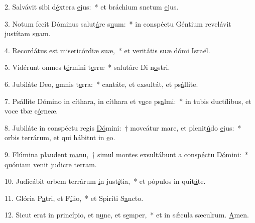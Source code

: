 2. Salvávit sibi d\uline{é}xtera \uline{e}jus:~* et bráchium snctum \uline{e}jus.\par 
3. Notum fecit Dóminus salut\uline{á}re s\uline{u}um:~* in conspéctu Géntium revelávit justítam s\uline{u}am.\par 
4. Recordátus est miseric\uline{ó}rdiæ s\uline{u}æ,~* et veritátis suæ dómi \uline{I}sraël.\par 
5. Vidérunt omnes t\uline{é}rmini t\uline{e}rræ~* salutáre Di n\uline{o}stri.\par 
6. Jubiláte Deo, \uline{o}mnis t\uline{e}rra:~* cantáte, et exsultát, et ps\uline{á}llite.\par 
7. Psállite Dómino in cíthara, in cíthara et v\uline{o}ce ps\uline{a}lmi:~* in tubis ductílibus, et voce tbæ c\uline{ó}rneæ.\par 
8. Jubiláte in conspéctu regis \uline{Dó}mini:~† moveátur mare, et plenit\uline{ú}do \uline{e}jus:~* orbis terrárum, et qui hábitnt in \uline{e}o.\par 
9. Flúmina plaudent \uline{ma}nu,~† simul montes exsultábunt a consp\uline{é}ctu D\uline{ó}mini:~* quóniam venit judicre t\uline{e}rram.\par 
10. Judicábit orbem terrárum \uline{i}n just\uline{í}tia,~* et pópulos in quit\uline{á}te.\par 
11. Glória P\uline{a}tri, et F\uline{í}lio,~* et Spiríti S\uline{a}ncto.\par 
12. Sicut erat in princípio, et n\uline{u}nc, et s\uline{e}mper,~* et in sǽcula sæculrum. \uline{A}men.\par 
